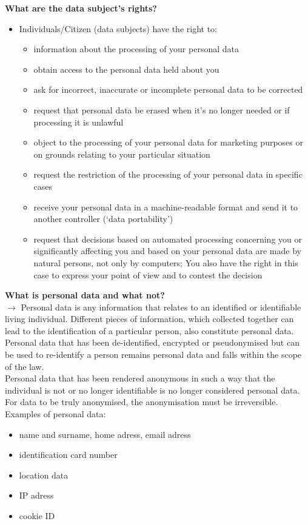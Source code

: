 \documentclass[11pt]{article}
\begin{document}
\textbf{What are the data subject's rights?}
\begin{itemize}
\item Individuals/Citizen (data subjects) have the right to:
\begin{itemize}
\item information about the processing of your personal data
\item obtain access to the personal data held about you
\item ask for incorrect, inaccurate or incomplete personal data to be corrected
\item request that personal data be erased when it’s no longer needed or if processing it is unlawful
\item object to the processing of your personal data for marketing purposes or on grounds relating to your particular situation
\item request the restriction of the processing of your personal data in specific cases
\item receive your personal data in a machine-readable format and send it to another controller (‘data portability’)
\item request that decisions based on automated processing concerning you or significantly affecting you and based on your personal data are made by natural persons, not only by computers; You also have the right in this case to express your point of view and to contest the decision
\end{itemize}
\end{itemize}

\textbf{What is personal data and what not?}\\
\(\rightarrow\) Personal data is any information that relates to an identified or identifiable living individual. Different pieces of information, which collected together can lead to the identification of a particular person, also constitute personal data.\\
Personal data that has been de-identified, encrypted or pseudonymised but can be used to re-identify a person remains personal data and falls within the scope of the law.\\
Personal data that has been rendered anonymous in such a way that the individual is not or no longer identifiable is no longer considered personal data. For data to be truly anonymised, the anonymisation must be irreversible.\\
Examples of personal data:
\begin{itemize}
\item name and surname, home adress, email adress
\item identification card number
\item location data
\item IP adress
\item cookie ID
\end{itemize}
\end{document}
